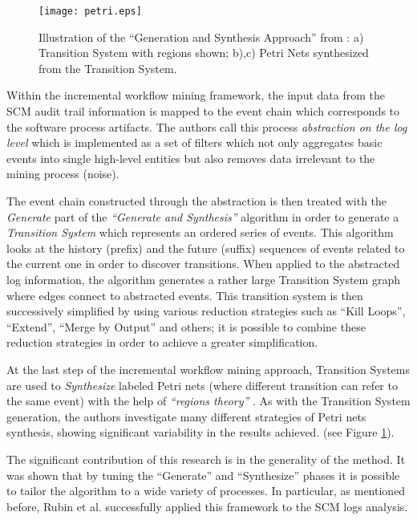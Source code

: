 \begin{figure}[tbp]
   \centering
   \texttt{[image: petri.eps]}
   \caption{Illustration of the ``Generation and Synthesis Approach'' from
\cite{citeulike:5043673}: a) Transition System with regions shown; b),c) Petri
Nets synthesized from the Transition System.}
   \label{fig:petri}
\end{figure}

Within the incremental workflow mining framework, the input data from the SCM
audit trail information is mapped to the event chain which corresponds to the
software process artifacts. The authors call this process \textit{abstraction on
the log level} which is implemented as a set of filters which not only
aggregates basic events into single high-level entities but also removes data
irrelevant to the mining process (noise). 

The event chain constructed through the abstraction is then treated with the
\textit{Generate} part of the \textit{``Generate and Synthesis''}
\cite{citeulike:3718014} algorithm in order to generate a \textit{Transition
System} which represents an ordered series of events. This algorithm looks at
the history (prefix) and the future (suffix) sequences of events related to the
current one in order to discover transitions.  When applied to the abstracted
log information, the algorithm generates a rather large Transition System graph
where edges connect to abstracted events. This transition system is then
successively simplified by using various reduction strategies such as ``Kill
Loops'', ``Extend'', ``Merge by Output'' and others; it is possible to combine
these reduction strategies in order to achieve a greater simplification.

At the last step of the incremental workflow mining approach, Transition Systems
are used to \textit{Synthesize} labeled Petri nets (where different transition
can refer to the same event) with the help of \textit{``regions theory''}
\cite{citeulike:5128170}. As with the Transition System generation, the authors
investigate many different strategies of Petri nets synthesis, showing
significant variability in the results achieved. (see Figure \ref{fig:petri}).

The significant contribution of this research is in the generality of the
method. It was shown that by tuning the ``Generate'' and ``Synthesize'' phases
it is possible to tailor the algorithm to a wide variety of processes. In
particular, as mentioned before, Rubin et al. successfully applied this
framework to the SCM logs analysis.

